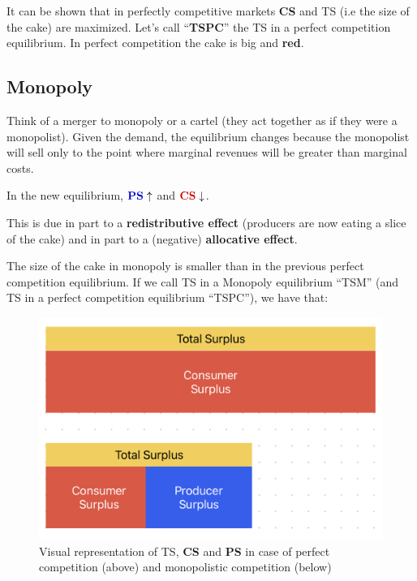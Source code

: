         It can be shown that in perfectly competitive markets \textcolor{BrickRed}{\textbf{CS}} and TS (i.e the size of the cake) are maximized. Let’s call “\textbf{TSPC}” the TS in a perfect competition equilibrium.
        In perfect competition the cake is big and \textcolor{BrickRed}{\textbf{red}}.

    \subsection{Monopoly}

        Think of a merger to monopoly or a cartel (they act together as if they were a monopolist). Given the demand, the equilibrium changes because the monopolist will sell only to the point where marginal revenues will be greater than marginal costs.

        In the new equilibrium, \( \textcolor{MyBlue}{\mathbf{PS}} \uparrow \) and \( \textcolor{BrickRed}{\mathbf{CS}} \downarrow \). 

        This is due in part to a \textbf{redistributive effect} (producers are now eating a slice of the cake) and in part to a (negative) \textbf{allocative effect}.

        The size of the cake in monopoly is smaller than in the previous perfect competition equilibrium. If we call TS in a Monopoly equilibrium “TSM” (and TS in a perfect competition equilibrium “TSPC”), we have that:

        \begin{figure}[h]
            \centering
            \includegraphics[width=0.70\linewidth]{graphics/L3-1_TotalSurplus.png}
            \caption{Visual representation of TS, \textcolor{BrickRed}{\textbf{CS}} and \textcolor{MyBlue}{\textbf{PS}} in case of perfect competition (above) and monopolistic competition (below)}
            \label{fig:TotalSurplus}
        \end{figure}

